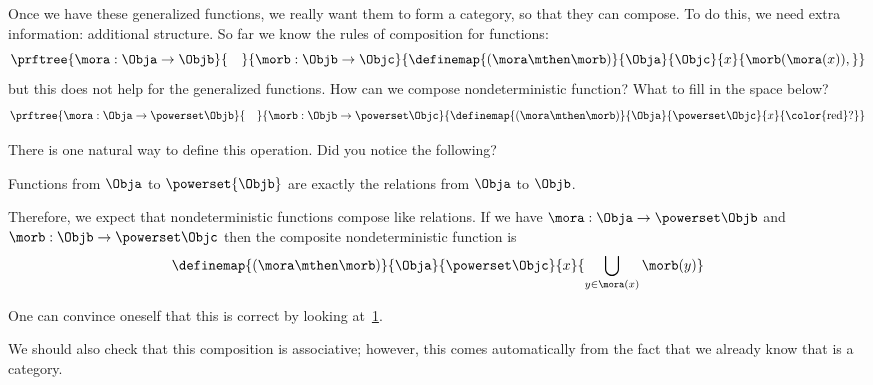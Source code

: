 Once we have these generalized functions, we really want them to form a category, so that they can compose. To do this, we need extra information: additional structure.
So far we know the rules of composition for functions:
% 
\begin{equation}
    \prftree{\mora: \Obja \to \Objb}{\quad}{\morb: \Objb \to \Objc}
    {\definemap{(\mora\mthen\morb)}{\Obja}{\Objc}%
    {x}{\morb(\mora(x)),}}
  \end{equation}
%   
but this does not help for the generalized functions. How can we compose nondeterministic function? What to fill in the space below?
% 
\begin{equation}
    \prftree{\mora: \Obja \to \powerset\Objb}{\quad}{\morb: \Objb \to \powerset \Objc}
    {\definemap{(\mora\mthen\morb)}{\Obja}{\powerset\Objc}%
    {x}{\text{\color{red}?}}}
  \end{equation}

There is one natural way to define this operation. 
Did you notice the following?

\begin{lemma}
Functions from $\Obja$ to $\powerset{\Objb}$ are exactly the relations from $\Obja$ to $\Objb$.
\end{lemma}


Therefore, we expect that nondeterministic functions compose like relations.
If we have $\mora: \Obja \to \powerset\Objb$ and $\morb: \Objb \to \powerset \Objc$ then the composite nondeterministic function is 
%
\begin{equation}
    \definemap{(\mora\mthen\morb)}{\Obja}{\powerset\Objc}%
    {x}{ \displaystyle \bigcup_{y\in \mora(x)}\morb(y)}
\end{equation}

One can convince oneself that this is correct by looking at~\cref{fig:mapping-nondeterministic}.

\begin{figure}[h]
    \caption{}
    \label{fig:mapping-nondeterministic}
\end{figure}

We should also check that this composition is associative; however, this comes automatically from the fact that we already know that \Rel is a category. 

